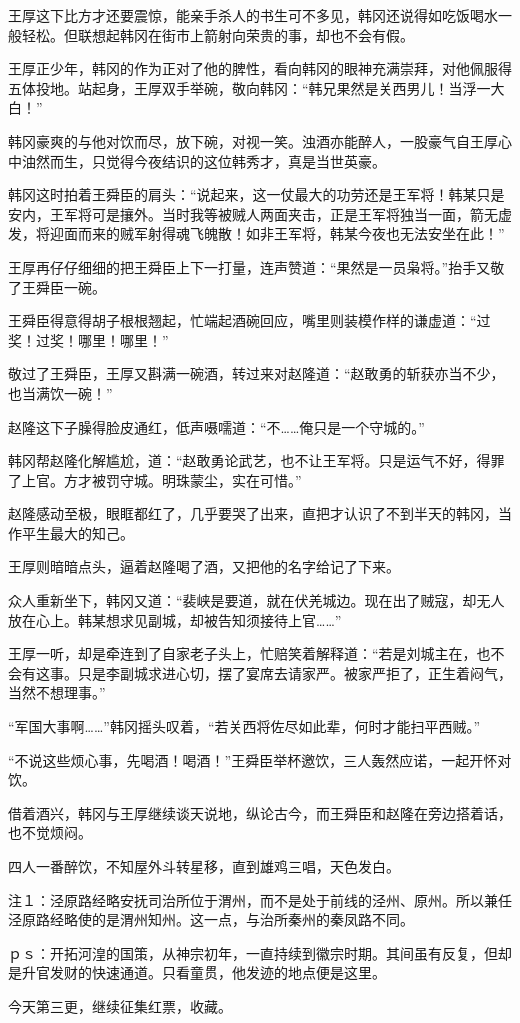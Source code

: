 王厚这下比方才还要震惊，能亲手杀人的书生可不多见，韩冈还说得如吃饭喝水一般轻松。但联想起韩冈在街市上箭射向荣贵的事，却也不会有假。

王厚正少年，韩冈的作为正对了他的脾性，看向韩冈的眼神充满崇拜，对他佩服得五体投地。站起身，王厚双手举碗，敬向韩冈：“韩兄果然是关西男儿！当浮一大白！”

韩冈豪爽的与他对饮而尽，放下碗，对视一笑。浊酒亦能醉人，一股豪气自王厚心中油然而生，只觉得今夜结识的这位韩秀才，真是当世英豪。

韩冈这时拍着王舜臣的肩头：“说起来，这一仗最大的功劳还是王军将！韩某只是安内，王军将可是攘外。当时我等被贼人两面夹击，正是王军将独当一面，箭无虚发，将迎面而来的贼军射得魂飞魄散！如非王军将，韩某今夜也无法安坐在此！”

王厚再仔仔细细的把王舜臣上下一打量，连声赞道：“果然是一员枭将。”抬手又敬了王舜臣一碗。

王舜臣得意得胡子根根翘起，忙端起酒碗回应，嘴里则装模作样的谦虚道：“过奖！过奖！哪里！哪里！”

敬过了王舜臣，王厚又斟满一碗酒，转过来对赵隆道：“赵敢勇的斩获亦当不少，也当满饮一碗！”

赵隆这下子臊得脸皮通红，低声嗫嚅道：“不……俺只是一个守城的。”

韩冈帮赵隆化解尴尬，道：“赵敢勇论武艺，也不让王军将。只是运气不好，得罪了上官。方才被罚守城。明珠蒙尘，实在可惜。”

赵隆感动至极，眼眶都红了，几乎要哭了出来，直把才认识了不到半天的韩冈，当作平生最大的知己。

王厚则暗暗点头，逼着赵隆喝了酒，又把他的名字给记了下来。

众人重新坐下，韩冈又道：“裴峡是要道，就在伏羌城边。现在出了贼寇，却无人放在心上。韩某想求见副城，却被告知须接待上官……”

王厚一听，却是牵连到了自家老子头上，忙赔笑着解释道：“若是刘城主在，也不会有这事。只是李副城求进心切，摆了宴席去请家严。被家严拒了，正生着闷气，当然不想理事。”

“军国大事啊……”韩冈摇头叹着，“若关西将佐尽如此辈，何时才能扫平西贼。”

“不说这些烦心事，先喝酒！喝酒！”王舜臣举杯邀饮，三人轰然应诺，一起开怀对饮。

借着酒兴，韩冈与王厚继续谈天说地，纵论古今，而王舜臣和赵隆在旁边搭着话，也不觉烦闷。

四人一番醉饮，不知屋外斗转星移，直到雄鸡三唱，天色发白。

注１：泾原路经略安抚司治所位于渭州，而不是处于前线的泾州、原州。所以兼任泾原路经略使的是渭州知州。这一点，与治所秦州的秦凤路不同。

ｐｓ：开拓河湟的国策，从神宗初年，一直持续到徽宗时期。其间虽有反复，但却是升官发财的快速通道。只看童贯，他发迹的地点便是这里。

今天第三更，继续征集红票，收藏。


